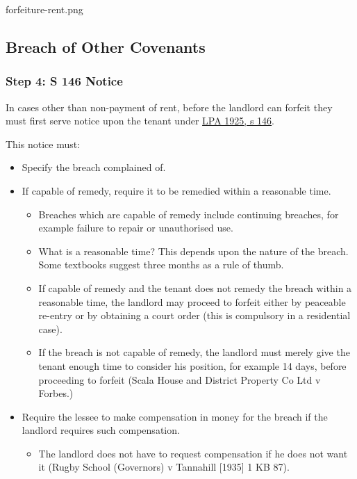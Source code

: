 \documentclass[
]{article}
\providecommand{\tightlist}{%
  \setlength{\itemsep}{0pt}\setlength{\parskip}{0pt}}
\begin{document}
forfeiture-rent.png

\hypertarget{breach-of-other-covenants}{%
\subsection{Breach of Other Covenants}\label{breach-of-other-covenants}}

\hypertarget{step-4-s-146-notice}{%
\subsubsection{Step 4: S 146 Notice}\label{step-4-s-146-notice}}

In cases other than non-payment of rent, before the landlord can forfeit
they must first serve notice upon the tenant under
\href{https://www.legislation.gov.uk/ukpga/Geo5/15-16/20/section/146}{LPA
1925, s 146}.

This notice must:

\begin{itemize}
\tightlist
\item
  Specify the breach complained of.
\item
  If capable of remedy, require it to be remedied within a reasonable
  time.

  \begin{itemize}
  \tightlist
  \item
    Breaches which are capable of remedy include continuing breaches,
    for example failure to repair or unauthorised use.
  \item
    What is a reasonable time? This depends upon the nature of the
    breach. Some textbooks suggest three months as a rule of thumb.
  \item
    If capable of remedy and the tenant does not remedy the breach
    within a reasonable time, the landlord may proceed to forfeit either
    by peaceable re-entry or by obtaining a court order (this is
    compulsory in a residential case).
  \item
    If the breach is not capable of remedy, the landlord must merely
    give the tenant enough time to consider his position, for example 14
    days, before proceeding to forfeit (Scala House and District
    Property Co Ltd v Forbes.)
  \end{itemize}
\item
  Require the lessee to make compensation in money for the breach if the
  landlord requires such compensation.

  \begin{itemize}
  \tightlist
  \item
    The landlord does not have to request compensation if he does not
    want it (Rugby School (Governors) v Tannahill {[}1935{]} 1 KB 87).
  \end{itemize}
\end{itemize}
\end{document}
